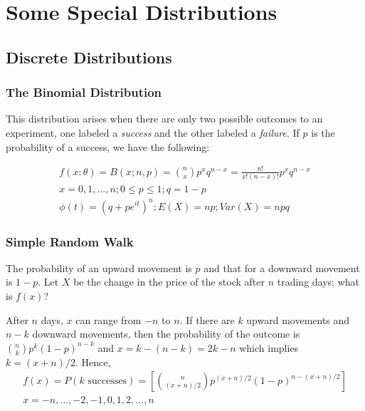 \documentclass{article}
\begin{document}
\section{Some Special Distributions}

\subsection{Discrete Distributions}

\subsubsection{The Binomial Distribution}

This distribution arises when there are only two possible outcomes to an experiment, one labeled a \textit{success} and the other labeled a \textit{failure}. If \(p\) is the probability of a success, we have the following:

\begin{equation*}
\begin{split}
    f(x:\theta)=B(x;n,p) = \binom{n}{x} p^x q^{n-x} = \frac{n!}{x!(n-x)!} p^x q^{n-x}\\
    x = 0,1,...,n ; 0 \leq p \leq 1; q = 1-p \\
    \phi(t) = (q+pe^{it})^n ; E(X) = np; Var(X)=npq
\end{split}
\end{equation*}

\subsubsection{Simple Random Walk}

The probability of an upward movement is \(p\) and that for a downward movement is \(1-p\). Let \(X\) be the change in the price of the stock after \(n\) trading days; what is \(f(x)\)?

After \(n\) days, \(x\) can range from \(-n\) to \(n\). If there are \(k\) upward movements and \(n-k\) downward movements, then the probability of the outcome is \( \binom{n}{k} p^k(1-p)^{n-k}\) and \(x = k-(n-k)= 2k-n\) which implies \(k=(x+n)/2\). Hence,
\begin{equation*}
\begin{split}
    f(x)=P(k \text{ successes}) = \left[\binom{n}{(x+n)/2} p^{(x+n)/2} (1-p)^{n-(x+n)/2} \right] \\
    x=-n,\dots,-2,-1,0,1,2,\dots,n
\end{split}
\end{equation*}
\end{document}
